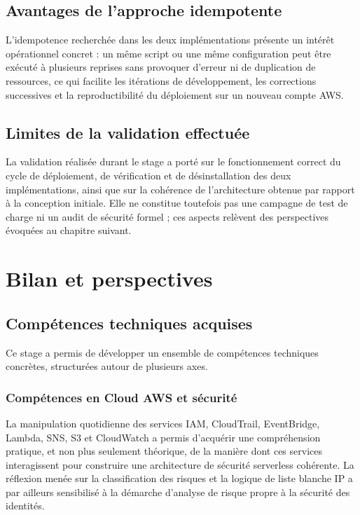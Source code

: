 \documentclass[11pt,a4paper]{report}
\begin{document}
\section{Avantages de l'approche idempotente}

L'idempotence recherchée dans les deux implémentations présente un intérêt opérationnel concret : un même script ou une même configuration peut être exécuté à plusieurs reprises sans provoquer d'erreur ni de duplication de ressources, ce qui facilite les itérations de développement, les corrections successives et la reproductibilité du déploiement sur un nouveau compte AWS.

\section{Limites de la validation effectuée}

La validation réalisée durant le stage a porté sur le fonctionnement correct du cycle de déploiement, de vérification et de désinstallation des deux implémentations, ainsi que sur la cohérence de l'architecture obtenue par rapport à la conception initiale. Elle ne constitue toutefois pas une campagne de test de charge ni un audit de sécurité formel ; ces aspects relèvent des perspectives évoquées au chapitre suivant.

\chapter{Bilan et perspectives}

\section{Compétences techniques acquises}

Ce stage a permis de développer un ensemble de compétences techniques concrètes, structurées autour de plusieurs axes.

\subsection{Compétences en Cloud AWS et sécurité}
La manipulation quotidienne des services IAM, CloudTrail, EventBridge, Lambda, SNS, S3 et CloudWatch a permis d'acquérir une compréhension pratique, et non plus seulement théorique, de la manière dont ces services interagissent pour construire une architecture de sécurité serverless cohérente. La réflexion menée sur la classification des risques et la logique de liste blanche IP a par ailleurs sensibilisé à la démarche d'analyse de risque propre à la sécurité des identités.
\end{document}
